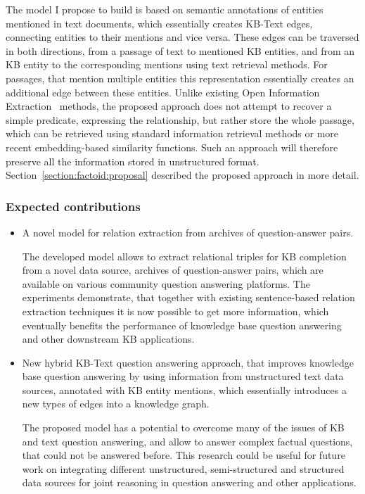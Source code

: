 The model I propose to build is based on semantic annotations of entities mentioned in text documents, which essentially creates KB-Text edges, connecting entities to their mentions and vice versa.
These edges can be traversed in both directions, \ie from a passage of text to mentioned KB entities, and from an KB entity to the corresponding mentions using text retrieval methods.
For passages, that mention multiple entities this representation essentially creates an additional edge between these entities.
Unlike existing Open Information Extraction~\cite{Fader:2014:OQA:2623330.2623677,FaderSE11} methods, the proposed approach does not attempt to recover a simple predicate, expressing the relationship, but rather store the whole passage, which can be retrieved using standard information retrieval methods or more recent embedding-based similarity functions.
Such an approach will therefore preserve all the information stored in unstructured format.
Section~\ref{section:factoid:proposal} described the proposed approach in more detail.

\subsubsection{Expected contributions}
\label{section:proposal:plan:factoid:contributions}

\begin{itemize}
\item A novel model for relation extraction from archives of question-answer pairs.

The developed model allows to extract relational triples for KB completion from a novel data source, \ie archives of question-answer pairs, which are available on various community question answering platforms.
The experiments demonstrate, that together with existing sentence-based relation extraction techniques it is now possible to get more information, which eventually benefits the performance of knowledge base question answering and other downstream KB applications.

\item New hybrid KB-Text question answering approach, that improves knowledge base question answering by using information from unstructured text data sources, annotated with KB entity mentions, which essentially introduces a new types of edges into a knowledge graph.

The proposed model has a potential to overcome many of the issues of KB and text question answering, and allow to answer complex factual questions, that could not be answered before.
This research could be useful for future work on integrating different unstructured, semi-structured and structured data sources for joint reasoning in question answering and other applications.

\end{itemize}

